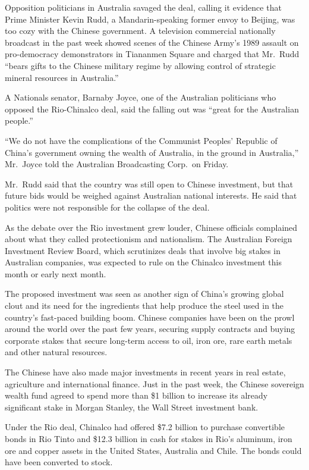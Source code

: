 \documentclass[12pt,a4paper,onecolumn]{article}
\begin{document}
Opposition politicians in Australia savaged the deal, calling it evidence that Prime Minister Kevin
Rudd, a Mandarin-speaking former envoy to Beijing, was too cozy with the Chinese government. A
television commercial nationally broadcast in the past week showed scenes of the Chinese Army's 1989
assault on pro-democracy demonstrators in Tiananmen Square and charged that Mr.~Rudd ``bears gifts
to the Chinese military regime by allowing control of strategic mineral resources in Australia.''

A Nationals senator, Barnaby Joyce, one of the Australian politicians who opposed the Rio-Chinalco
deal, said the falling out was ``great for the Australian people.''

``We do not have the complications of the Communist Peoples' Republic of China's government owning
the wealth of Australia, in the ground in Australia,'' Mr.~Joyce told the Australian Broadcasting
Corp.~on Friday.

Mr.~Rudd said that the country was still open to Chinese investment, but that future bids would be
weighed against Australian national interests. He said that politics were not responsible for the
collapse of the deal.

As the debate over the Rio investment grew louder, Chinese officials complained about what they
called protectionism and nationalism. The Australian Foreign Investment Review Board, which
scrutinizes deals that involve big stakes in Australian companies, was expected to rule on the
Chinalco investment this month or early next month.

The proposed investment was seen as another sign of China's growing global clout and its need for
the ingredients that help produce the steel used in the country's fast-paced building boom. Chinese
companies have been on the prowl around the world over the past few years, securing supply contracts
and buying corporate stakes that secure long-term access to oil, iron ore, rare earth metals and
other natural resources.

The Chinese have also made major investments in recent years in real estate, agriculture and
international finance. Just in the past week, the Chinese sovereign wealth fund agreed to spend more
than \$1 billion to increase its already significant stake in Morgan Stanley, the Wall Street
investment bank.

Under the Rio deal, Chinalco had offered \$7.2 billion to purchase convertible bonds in Rio Tinto
and \$12.3 billion in cash for stakes in Rio's aluminum, iron ore and copper assets in the United States, Australia and Chile. The bonds could have been converted to stock.
\end{document}
